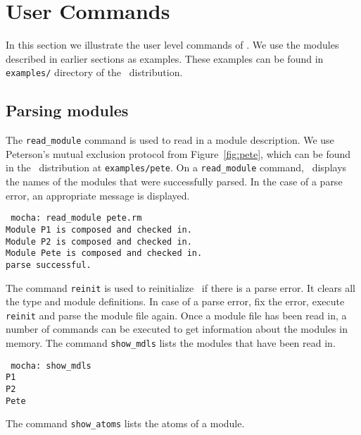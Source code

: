 \chapter {User Commands}
\label{sec:commands}
\label{chap:commands}

In this section we illustrate the user level commands of \mocha.
We use the modules described in earlier sections as examples. 
These examples can be found in {\tt examples/} directory of the \mocha\ distribution.

\section{Parsing modules}
\label{sec:parsing-modules}

The {\tt read\_module} command is used to read in a module description.
We use Peterson's mutual exclusion protocol from Figure{~\ref{fig:pete}},
which can be found in the \mocha\ distribution at {\tt examples/pete}.
On a {\tt read\_module} command, \mocha\ displays the names of the modules
that were successfully parsed. In the case of a parse error, an appropriate
message is displayed.

\mypar
{\tt 
mocha: read\_module pete.rm \\
Module P1 is composed and checked in. \\
Module P2 is composed and checked in. \\
Module Pete is composed and checked in. \\
parse successful. \\
}


\mypar
The command {\tt reinit} is used to reinitialize \mocha\ if there is a
parse error. It clears all the type and module definitions. In case of
a parse error, fix the error, execute {\tt reinit} and parse the
module file again. 
Once a module file has been read in, a number of commands can be
executed to get information about the modules in memory. 
The command {\tt show\_mdls} lists the modules that have been read in.

\mypar
{\tt
mocha: show\_mdls \\
P1 \\                 
P2 \\                 
Pete \\               
}

\mypar
The command {\tt show\_atoms} lists the atoms of a module.

